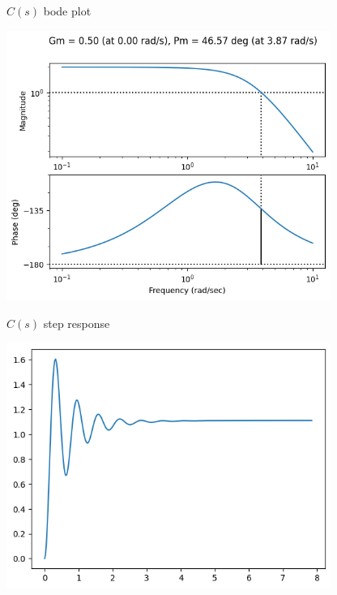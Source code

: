 \documentclass[11pt]{article}
\begin{document}
$C(s)$ bode plot

\includegraphics[width=300pt]{a5_7.png}

$C(s)$ step response

\includegraphics[width=300pt]{a5_8.png}
\end{document}
